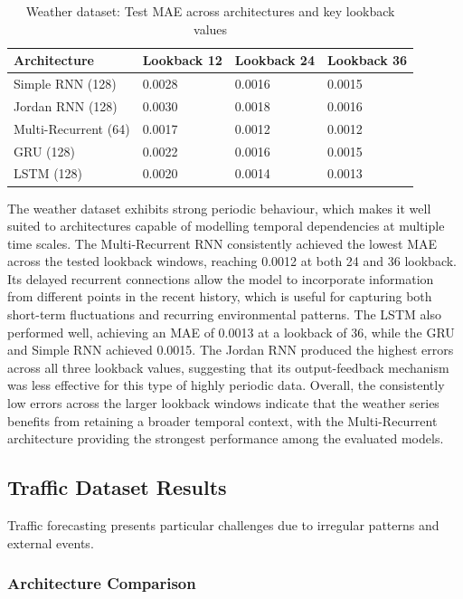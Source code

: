 \documentclass[conference]{IEEEtran}
\begin{document}
\begin{table}[H]
\centering
\caption{Weather dataset: Test MAE across architectures and key lookback values}
\label{tab:weather_results}
\begin{tabular}{llll}
\toprule
\textbf{Architecture} & Lookback 12 & Lookback 24 & Lookback 36 \\
\midrule
Simple RNN (128) & 0.0028 & 0.0016 & 0.0015 \\
Jordan RNN (128) & 0.0030 & 0.0018 & 0.0016 \\
Multi-Recurrent (64) & 0.0017 & 0.0012 & 0.0012 \\
GRU (128) & 0.0022 & 0.0016 & 0.0015 \\
LSTM (128) & 0.0020 & 0.0014 & 0.0013 \\
\bottomrule
\end{tabular}
\end{table}

The weather dataset exhibits strong periodic behaviour, which makes
it well suited to architectures capable of modelling temporal dependencies
at multiple time scales. The Multi-Recurrent RNN consistently achieved the lowest
MAE across the tested lookback windows, reaching 0.0012 at both 24 and 36 lookback.
Its delayed recurrent connections allow the model to incorporate information from
different points in the recent history, which is useful for capturing both short-term
fluctuations and recurring environmental patterns. The LSTM also performed well,
achieving an MAE of 0.0013 at a lookback of 36, while the GRU and Simple RNN achieved
0.0015. The Jordan RNN produced the highest errors across all three lookback values,
suggesting that its output-feedback mechanism was less effective for this type of
highly periodic data. Overall, the consistently low errors across the larger lookback
windows indicate that the weather series benefits from retaining a broader temporal
context, with the Multi-Recurrent architecture providing the strongest performance among
the evaluated models.

\subsection{Traffic Dataset Results}

Traffic forecasting presents particular challenges due to irregular patterns and external events.

\subsubsection{Architecture Comparison}
\end{document}
